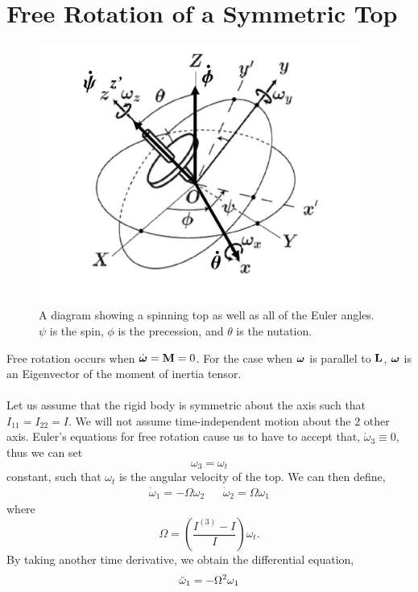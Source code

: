 \documentclass{book}
\begin{document}
\section{Free Rotation of a Symmetric Top}
\begin{figure}
	\centering
	\includegraphics[width=300pt]{spinningtop.png}
	\caption{A diagram showing a spinning top as well as all of the Euler angles. $\psi$ is the spin, $\phi$ is the precession, and $\theta$ is the nutation.}
	\label{top}
\end{figure}
Free rotation occurs when $\Dot{\vb*{\omega}} = \vb{M} = 0$. For the case when $\vb*{\omega}$ is parallel to $\vb{L}$, $\vb*{\omega}$ is an Eigenvector of the moment of inertia tensor.
\\\\
Let us assume that the rigid body is symmetric about the axis such that $I_{11} = I_{22} = I$. We will not assume time-independent motion about the 2 other axis. Euler's equations for free rotation cause us to have to accept that, $\Dot{\omega}_3 \equiv 0$, thus we can set
\begin{equation}
    \omega_3 = \omega_t
\end{equation}
constant, such that $\omega_t$ is the angular velocity of the top. We can then define,
\begin{align}
    \Dot{\omega}_1 = -\Omega\omega_2 && \Dot{\omega}_2 = \Omega\omega_1
\end{align}
where
\begin{equation}
    \Omega = \left(\frac{I^{(3)}-I}{I}\right)\omega_t.
\end{equation}
By taking another time derivative, we obtain the differential equation,
\begin{equation}
    \Ddot{\omega}_1 = -\Omega^2\omega_1
\end{equation}
\end{document}
